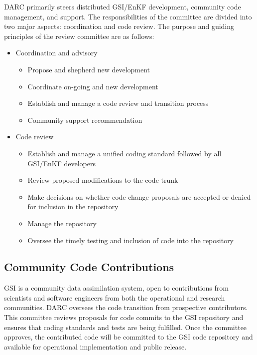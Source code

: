 DARC primarily steers distributed GSI/EnKF development, community code management, and support. The responsibilities of the committee are divided into two major aspects: coordination and code review. The purpose and guiding principles of the review committee are as follows:
\begin{itemize}
\item{Coordination and advisory}
\begin{itemize}
\item Propose and shepherd new development
\item Coordinate on-going and new development
\item Establish and manage a code review and transition process
\item Community support recommendation
\end{itemize}
\item{Code review}
\begin{itemize}
\item Establish and manage a unified coding standard followed by all GSI/EnKF developers
\item Review proposed modifications to the code trunk
\item Make decisions on whether code change proposals are accepted or denied for
inclusion in the repository
\item Manage the repository
\item Oversee the timely testing and inclusion of code into the repository
\end{itemize}

\end{itemize}

\subsection{Community Code Contributions}

GSI is a community data assimilation system, open to contributions from scientists and software engineers from both the operational and research communities. DARC oversees the code transition from prospective contributors. This committee reviews proposals for code commits to the GSI repository and ensures that coding standards and tests are being fulfilled. Once the committee approves, the contributed code will be committed to the GSI code repository and available for operational implementation and public release. 

